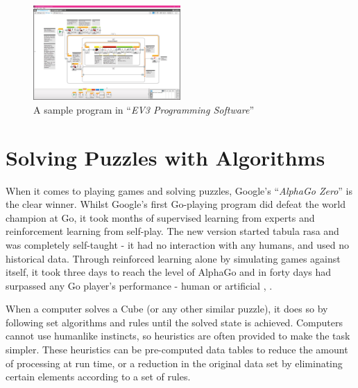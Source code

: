 \documentclass{report}
\newcommand{\tit}[1]{\textit{#1}}
\newcommand{\propernoun}[1]{\enquote{\tit{#1}}}
\begin{document}
	\begin{figure}[H]
		\centering
		\includegraphics[width=0.5\textwidth]{Resources/Images/scrEV3ProgrammingSoftware.jpg}
		\caption{A sample program in \propernoun{EV3 Programming Software}}
		\label{fig:ev3software}
	\end{figure}
    
    \section{Solving Puzzles with Algorithms}
    When it comes to playing games and solving puzzles, Google's \propernoun{AlphaGo Zero} is the clear winner. Whilst Google's first Go-playing program did defeat the world champion at Go, it took months of supervised learning from experts and reinforcement learning from self-play. The new version started tabula rasa and was completely self-taught - it had no interaction with any humans, and used no historical data. Through reinforced learning alone by simulating games against itself, it took three days to reach the level of AlphaGo and in forty days had surpassed any Go player's performance - human or artificial \cite{Silver2017}, \cite{Cellan-Jones2017}.
    
    When a computer solves a Cube (or any other similar puzzle), it does so by following set algorithms and rules until the solved state is achieved. Computers cannot use humanlike instincts, so heuristics are often provided to make the task simpler. These heuristics can be pre-computed data tables to reduce the amount of processing at run time, or a reduction in the original data set by eliminating certain elements according to a set of rules.
    
\end{document}
